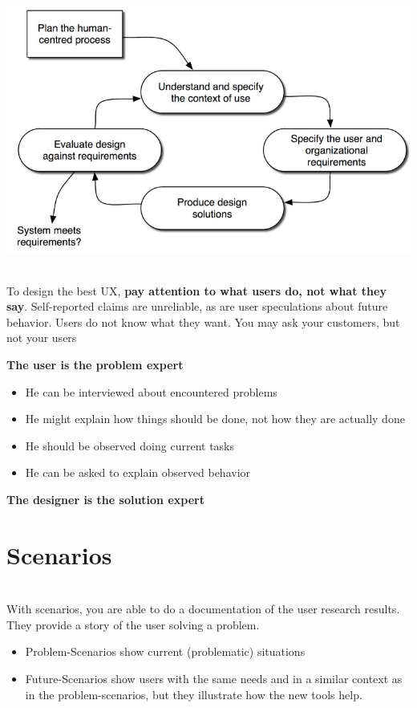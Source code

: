 \begin{breakbox}
 \\
\includegraphics[width=.25\textwidth]{figures/standard_user_centered_process.png}
\end{breakbox}

\begin{breakbox}
 \\
To design the best UX, \textbf{pay attention to what users do, not what they say}. Self-reported claims are unreliable, as are user speculations about future behavior. Users do not know what they want. You may ask your customers, but not your users

\textbf{The user is the problem expert}
\begin{itemize}
    \item He can be interviewed about encountered problems
    \item He might explain how things should be done, not how they are actually done
\item He should be observed doing current tasks
\item He can be asked to explain observed behavior
\end{itemize}

\textbf{The designer is the solution expert}
\end{breakbox}


\section{Scenarios}
\begin{breakbox}
 \\
With scenarios, you are able to do a documentation of the user research
results. They provide a story of the user solving a problem. 
\begin{itemize}
    \item Problem-Scenarios show current (problematic) situations
    \item Future-Scenarios show users with the same needs and in a similar context
as in the problem-scenarios, but they illustrate how the new tools help.
\end{itemize}
\end{breakbox}

